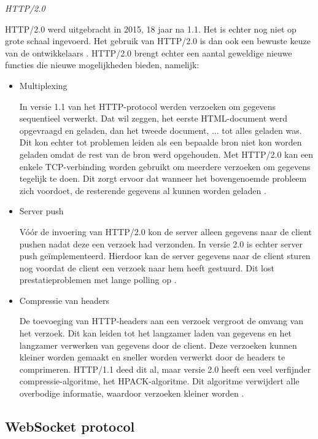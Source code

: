 \emph{HTTP/2.0}

HTTP/2.0 werd uitgebracht in 2015, 18 jaar na 1.1. Het is echter nog niet op grote schaal ingevoerd. Het gebruik van HTTP/2.0 is dan ook een bewuste keuze van de ontwikkelaars \autocite{Ab}.
HTTP/2.0 brengt echter een aantal geweldige nieuwe functies die nieuwe mogelijkheden bieden, namelijk:

\begin{itemize}
    \item Multiplexing
    
    In versie 1.1 van het HTTP-protocol werden verzoeken om gegevens sequentieel verwerkt. Dat wil zeggen, het eerste HTML-document werd opgevraagd en geladen, dan het tweede document, ... tot alles geladen was. Dit kon echter tot problemen leiden als een bepaalde bron niet kon worden geladen omdat de rest van de bron werd opgehouden. Met HTTP/2.0 kan een enkele TCP-verbinding worden gebruikt om meerdere verzoeken om gegevens tegelijk te doen. Dit zorgt ervoor dat wanneer het bovengenoemde probleem zich voordoet, de resterende gegevens al kunnen worden geladen \autocite{Cloudflare}.
    
    \item Server push
    
    Vóór de invoering van HTTP/2.0 kon de server alleen gegevens naar de client pushen nadat deze een verzoek had verzonden. In versie 2.0 is echter server push geïmplementeerd. Hierdoor kan de server gegevens naar de client sturen nog voordat de client een verzoek naar hem heeft gestuurd. Dit lost prestatieproblemen met lange polling op \autocite{Grigorik2016}.
    
    \item Compressie van headers
    
    De toevoeging van HTTP-headers aan een verzoek vergroot de omvang van het verzoek. Dit kan leiden tot het langzamer laden van gegevens en het langzamer verwerken van gegevens door de client. Deze verzoeken kunnen kleiner worden gemaakt en sneller worden verwerkt door de headers te comprimeren. HTTP/1.1 deed dit al, maar versie 2.0 heeft een veel verfijnder compressie-algoritme, het HPACK-algoritme. Dit algoritme verwijdert alle overbodige informatie, waardoor verzoeken kleiner worden \autocite{Cloudflare}.
\end{itemize}

\subsection {WebSocket protocol}

